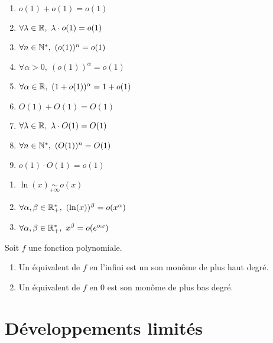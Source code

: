 \begin{proposition}
\begin{multicols}{2}
    \begin{enumerate}
        \item $o(1) + o(1) = o(1)$
        \item $\forall \lambda \in \mathbb{R},\ \lambda \cdot o(1) = o(1)$
        \item $\forall n \in \mathbb{N}^*,\ (o(1))^n = o(1)$
        \item $\forall \alpha > 0,\ (o(1))^{\alpha} = o(1)$
        \item $\forall \alpha \in \mathbb{R},\ (1 + o(1))^{\alpha} = 1 + o(1)$
        \item $O(1) + O(1) = O(1)$
        \item $\forall \lambda \in \mathbb{R},\ \lambda \cdot O(1) = O(1)$
        \item $\forall n \in \mathbb{N}^*,\ (O(1))^n = O(1)$
        \item $o(1) \cdot O(1) = o(1)$
    \end{enumerate}
\end{multicols}
\end{proposition}

\begin{proposition}
\begin{multicols}{2}
    \begin{enumerate}
        \item $\ln(x) \underset{+\infty}{\sim} o(x)$
        \item $\forall \alpha, \beta \in \R_+^*,\ (\ln(x))^{\beta} = o(x^{\alpha})$
        \item $\forall \alpha, \beta \in \R_+^*,\ x^{\beta} = o(e^{\alpha x})$
    \end{enumerate}
\end{multicols}
\end{proposition}

\begin{proposition}
    Soit $f$ une fonction polynomiale. 
    \begin{enumerate}
        \item Un équivalent de $f$ en l'infini est un son monôme de plus haut degré.
        \item Un équivalent de $f$ en 0 est son monôme de plus bas degré.
    \end{enumerate}
\end{proposition}

\section{Développements limités}

